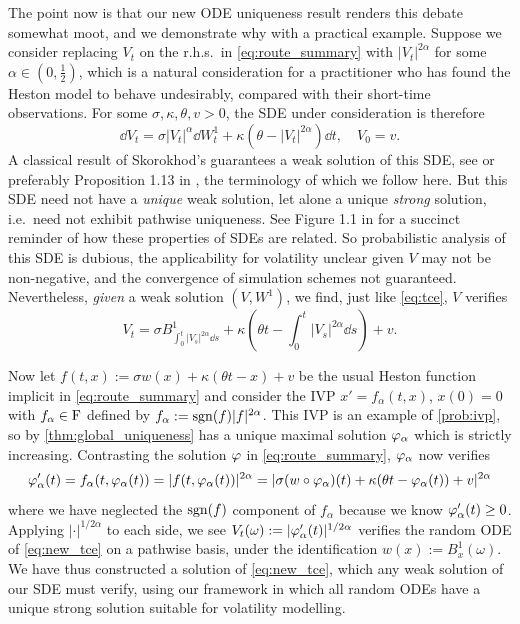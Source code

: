 The point now is that our new ODE uniqueness result renders this debate somewhat moot, and we demonstrate why with a practical example. Suppose we consider replacing $V_t$ on the r.h.s.~in \autoref{eq:route_summary} with $|V_t|^{2\alpha}$ for some $\alpha\in(0,\frac12)$, which is a natural consideration for a practitioner who has found the Heston model to behave undesirably, compared with their short-time observations. For some $\sigma,\kappa,\theta,v>0$, the SDE under consideration is therefore
\begin{equation}\label{eq:consider_sde}
    \dd V_t = \sigma|V_t|^\alpha\dd W^1_t + \kappa(\theta - |V_t|^{2\alpha})\dd t,\quad V_0=v.
\end{equation}
A classical result of Skorokhod's guarantees a weak solution of this SDE, see \cite{skorokhod_1965} or preferably Proposition 1.13 in \cite{cherny_2005}, the terminology of which we follow here. But this SDE need not have a \emph{unique} weak solution, let alone a unique \emph{strong} solution, i.e.~need not exhibit pathwise uniqueness. See Figure 1.1 in \cite{cherny_2005} for a succinct reminder of how these properties of SDEs are related. So probabilistic analysis of this SDE is dubious, the applicability for volatility unclear given $V$ may not be non-negative, and the convergence of simulation schemes not guaranteed. Nevertheless, \emph{given} a weak solution $(V,W^1)$, we find, just like \autoref{eq:tce}, $V$ verifies
\begin{equation}\label{eq:new_tce}
    V_t = \sigma B^1_{\int_0^t|V_s|^{2\alpha}\dd s} + \kappa\left(\theta t  - \int_0^t|V_s|^{2\alpha}\dd s\right) + v.
\end{equation}

Now let $f(t,x):=\sigma w(x) + \kappa(\theta t - x) + v$ be the usual Heston function implicit in \autoref{eq:route_summary} and consider the IVP $x'=f_\alpha(t,x)$, $x(0)=0$ with $f_\alpha\in\mathrm{F}$ defined by $f_\alpha := \mathrm{sgn}(f)|f|^{2\alpha}$. This IVP is an example of \autoref{prob:ivp}, so by \autoref{thm:global_uniqueness} has a unique maximal solution $\varphi_\alpha$ which is strictly increasing. Contrasting the solution $\varphi$ in \autoref{eq:route_summary}, $\varphi_\alpha$ now verifies
\begin{equation}
    \varphi'_\alpha(t) = f_\alpha(t,\varphi_\alpha(t)) = |f(t,\varphi_\alpha(t))|^{2\alpha} = |\sigma (w\circ\varphi_\alpha)(t) + \kappa(\theta t - \varphi_\alpha(t)) + v|^{2\alpha}
\end{equation}
where we have neglected the $\mathrm{sgn}(f)$ component of $f_\alpha$ because we know $\varphi'_\alpha(t)\ge0$. Applying $|\cdot|^{1/2\alpha}$ to each side, we see $V_t(\omega):=|\varphi_\alpha'(t)|^{1/2\alpha}$ verifies the random ODE of \autoref{eq:new_tce} on a pathwise basis, under the identification $w(x) := B^1_x(\omega)$. We have thus constructed a solution of \autoref{eq:new_tce}, which any weak solution of our SDE must verify, using our framework in which all random ODEs have a unique strong solution suitable for volatility modelling.

